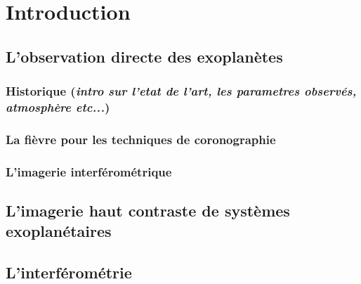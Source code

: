 \clearpage
\section{Introduction}
\setcounter{figure}{0}
\setcounter{table}{0}

\subsection{L'observation directe des exoplanètes}
\label{sec:ImagerieDirecte}

\subsubsection{Historique (\textit{intro sur l'etat de l'art, les parametres observés, atmosphère etc...})}

\subsubsection{La fièvre pour les techniques de coronographie}

\subsubsection{L'imagerie interférométrique}

\subsection{L'imagerie haut contraste de systèmes exoplanétaires}

\subsection{L'interférométrie}

